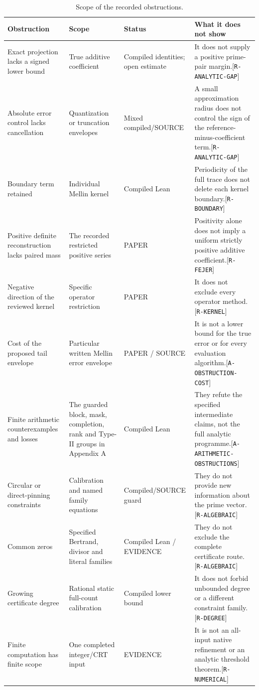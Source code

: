 \documentclass[11pt]{article}
\newcommand{\ev}[1]{{\scriptsize[\nolinkurl{#1}]}}
\theoremstyle{remark}
\begin{document}
\begin{table}[ht]\centering\footnotesize
\caption{Scope of the recorded obstructions.}\label{tab:obstructions}
\begin{tabular}{p{3.1cm}p{3.5cm}p{2.1cm}p{5.7cm}}
\toprule
Obstruction & Scope & Status & What it does not show\\
\midrule
Exact projection lacks a signed lower bound & True additive coefficient &
Compiled identities; open estimate & It does not supply a positive
prime-pair margin.\ev{R-ANALYTIC-GAP}\\
Absolute error control lacks cancellation & Quantization or truncation
envelopes & Mixed compiled/\allowbreak SOURCE & A small approximation radius does not
control the sign of the reference-minus-coefficient term.\ev{R-ANALYTIC-GAP}\\
Boundary term retained & Individual Mellin kernel & Compiled Lean &
Periodicity of the full trace does not delete each kernel boundary.\ev{R-BOUNDARY}\\
Positive definite reconstruction lacks paired mass & The recorded
restricted positive series & PAPER & Positivity alone does not imply a
uniform strictly positive additive coefficient.\ev{R-FEJER}\\
Negative direction of the reviewed kernel & Specific operator restriction
& PAPER & It does not exclude every operator method.\ev{R-KERNEL}\\
Cost of the proposed tail envelope & Particular written Mellin error
envelope & PAPER / SOURCE & It is not a lower bound for the true error or
for every evaluation algorithm.\ev{A-OBSTRUCTION-COST}\\
Finite arithmetic counterexamples and losses & The guarded block, mask,
completion, rank and Type-II groups in Appendix A & Compiled Lean &
They refute the specified intermediate claims, not the full analytic
programme.\ev{A-ARITHMETIC-OBSTRUCTIONS}\\
Circular or direct-pinning constraints & Calibration and named family
equations & Compiled/\allowbreak SOURCE guard & They do not provide new information
about the prime vector.\ev{R-ALGEBRAIC}\\
Common zeros & Specified Bertrand, divisor and literal families & Compiled
Lean / EVIDENCE & They do not exclude the complete certificate
route.\ev{R-ALGEBRAIC}\\
Growing certificate degree & Rational static full-count calibration &
Compiled lower bound & It does not forbid unbounded degree or a different
constraint family.\ev{R-DEGREE}\\
Finite computation has finite scope & One completed integer/CRT input &
EVIDENCE & It is not an all-input native refinement or an analytic
threshold theorem.\ev{R-NUMERICAL}\\
\bottomrule
\end{tabular}
\end{table}
\end{document}
